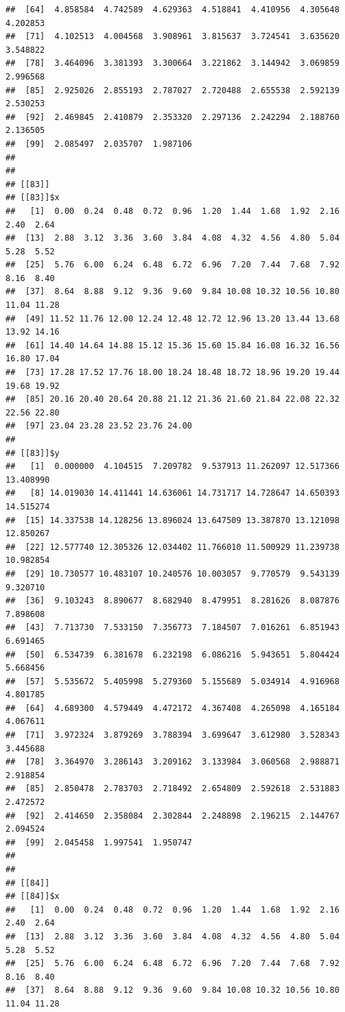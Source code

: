 \documentclass[
  ignorenonframetext,
]{beamer}
\begin{document}
\begin{frame}[fragile]{}
\begin{verbatim}
##  [64]  4.858584  4.742589  4.629363  4.518841  4.410956  4.305648  4.202853
##  [71]  4.102513  4.004568  3.908961  3.815637  3.724541  3.635620  3.548822
##  [78]  3.464096  3.381393  3.300664  3.221862  3.144942  3.069859  2.996568
##  [85]  2.925026  2.855193  2.787027  2.720488  2.655538  2.592139  2.530253
##  [92]  2.469845  2.410879  2.353320  2.297136  2.242294  2.188760  2.136505
##  [99]  2.085497  2.035707  1.987106
## 
## 
## [[83]]
## [[83]]$x
##   [1]  0.00  0.24  0.48  0.72  0.96  1.20  1.44  1.68  1.92  2.16  2.40  2.64
##  [13]  2.88  3.12  3.36  3.60  3.84  4.08  4.32  4.56  4.80  5.04  5.28  5.52
##  [25]  5.76  6.00  6.24  6.48  6.72  6.96  7.20  7.44  7.68  7.92  8.16  8.40
##  [37]  8.64  8.88  9.12  9.36  9.60  9.84 10.08 10.32 10.56 10.80 11.04 11.28
##  [49] 11.52 11.76 12.00 12.24 12.48 12.72 12.96 13.20 13.44 13.68 13.92 14.16
##  [61] 14.40 14.64 14.88 15.12 15.36 15.60 15.84 16.08 16.32 16.56 16.80 17.04
##  [73] 17.28 17.52 17.76 18.00 18.24 18.48 18.72 18.96 19.20 19.44 19.68 19.92
##  [85] 20.16 20.40 20.64 20.88 21.12 21.36 21.60 21.84 22.08 22.32 22.56 22.80
##  [97] 23.04 23.28 23.52 23.76 24.00
## 
## [[83]]$y
##   [1]  0.000000  4.104515  7.209782  9.537913 11.262097 12.517366 13.408990
##   [8] 14.019030 14.411441 14.636061 14.731717 14.728647 14.650393 14.515274
##  [15] 14.337538 14.128256 13.896024 13.647509 13.387870 13.121098 12.850267
##  [22] 12.577740 12.305326 12.034402 11.766010 11.500929 11.239738 10.982854
##  [29] 10.730577 10.483107 10.240576 10.003057  9.770579  9.543139  9.320710
##  [36]  9.103243  8.890677  8.682940  8.479951  8.281626  8.087876  7.898608
##  [43]  7.713730  7.533150  7.356773  7.184507  7.016261  6.851943  6.691465
##  [50]  6.534739  6.381678  6.232198  6.086216  5.943651  5.804424  5.668456
##  [57]  5.535672  5.405998  5.279360  5.155689  5.034914  4.916968  4.801785
##  [64]  4.689300  4.579449  4.472172  4.367408  4.265098  4.165184  4.067611
##  [71]  3.972324  3.879269  3.788394  3.699647  3.612980  3.528343  3.445688
##  [78]  3.364970  3.286143  3.209162  3.133984  3.060568  2.988871  2.918854
##  [85]  2.850478  2.783703  2.718492  2.654809  2.592618  2.531883  2.472572
##  [92]  2.414650  2.358084  2.302844  2.248898  2.196215  2.144767  2.094524
##  [99]  2.045458  1.997541  1.950747
## 
## 
## [[84]]
## [[84]]$x
##   [1]  0.00  0.24  0.48  0.72  0.96  1.20  1.44  1.68  1.92  2.16  2.40  2.64
##  [13]  2.88  3.12  3.36  3.60  3.84  4.08  4.32  4.56  4.80  5.04  5.28  5.52
##  [25]  5.76  6.00  6.24  6.48  6.72  6.96  7.20  7.44  7.68  7.92  8.16  8.40
##  [37]  8.64  8.88  9.12  9.36  9.60  9.84 10.08 10.32 10.56 10.80 11.04 11.28

\end{verbatim}
\end{frame}
\end{document}
